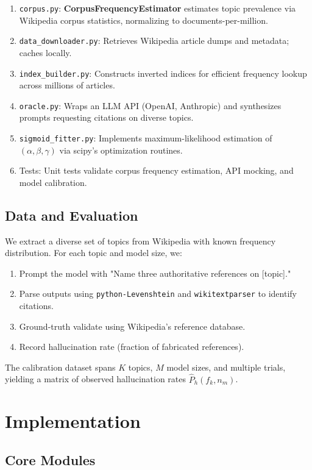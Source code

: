 \documentclass[11pt,a4paper]{article}
\begin{document}
\begin{enumerate}
\item \texttt{corpus.py}: \textbf{CorpusFrequencyEstimator} estimates topic prevalence via Wikipedia corpus statistics, normalizing to documents-per-million.
\item \texttt{data\_downloader.py}: Retrieves Wikipedia article dumps and metadata; caches locally.
\item \texttt{index\_builder.py}: Constructs inverted indices for efficient frequency lookup across millions of articles.
\item \texttt{oracle.py}: Wraps an LLM API (OpenAI, Anthropic) and synthesizes prompts requesting citations on diverse topics.
\item \texttt{sigmoid\_fitter.py}: Implements maximum-likelihood estimation of $(\alpha, \beta, \gamma)$ via scipy's optimization routines.
\item Tests: Unit tests validate corpus frequency estimation, API mocking, and model calibration.
\end{enumerate}

\subsection{Data and Evaluation}

We extract a diverse set of topics from Wikipedia with known frequency distribution. For each topic and model size, we:
\begin{enumerate}
\item Prompt the model with "Name three authoritative references on [topic]."
\item Parse outputs using \texttt{python-Levenshtein} and \texttt{wikitextparser} to identify citations.
\item Ground-truth validate using Wikipedia's reference database.
\item Record hallucination rate (fraction of fabricated references).
\end{enumerate}

The calibration dataset spans $K$ topics, $M$ model sizes, and multiple trials, yielding a matrix of observed hallucination rates $\hat{P}_h(f_k, n_m)$.

\section{Implementation}

\subsection{Core Modules}
\end{document}
